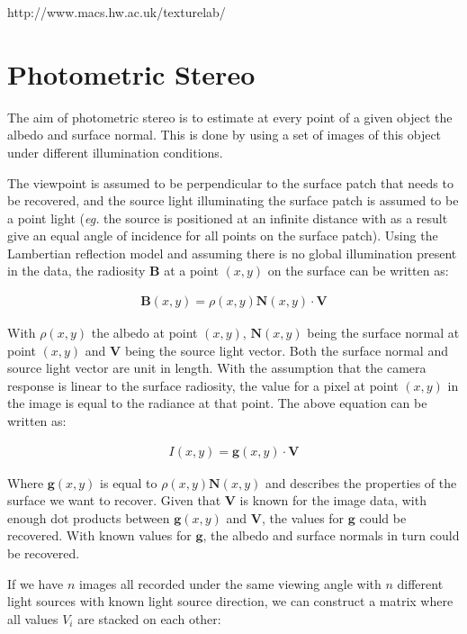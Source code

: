 http://www.macs.hw.ac.uk/texturelab/

\section{Photometric Stereo}\label{sec:PhotometricStereo}
The aim of photometric stereo is to estimate at every point of a given object the albedo and surface normal. This is done by using a set of images of this object under different illumination conditions. 

The viewpoint is assumed to be perpendicular to the surface patch that needs to be recovered, and the source light illuminating the surface patch is assumed to be a point light (\textit{eg.} the source is positioned at an infinite distance with as a result give an equal angle of incidence for all points on the surface patch). Using the Lambertian reflection model and assuming there is no global illumination present in the data, the radiosity \textbf{B} at a point $(x, y)$ on the surface can be written as:

	\begin{eqnarray*}
		\textbf{B}(x,y) = \rho(x,y)\textbf{N}(x,y) \cdot \textbf{V}
	\end{eqnarray*}

\noindent With $\rho(x,y)$ the albedo at point $(x,y)$, $\textbf{N}(x,y)$ being the surface normal at point $(x,y)$ and $\textbf{V}$ being the source light vector. Both the surface normal and source light vector are unit in length. With the assumption that the camera response is linear to the surface radiosity, the value for a pixel at point $(x,y)$ in the image is equal to the radiance at that point. The above equation can be written as:

	\begin{eqnarray*}
		I(x,y) =  \textbf{g}(x,y) \cdot \textbf{V}
	\end{eqnarray*}

\noindent Where $\textbf{g}(x,y)$ is equal to $\rho(x,y)\textbf{N}(x,y)$ and describes the properties of the surface we want to recover. Given that $\textbf{V}$ is known for the image data, with enough dot products between $\textbf{g}(x,y)$ and $\textbf{V}$, the values for $\textbf{g}$ could be recovered. With known values for $\textbf{g}$, the albedo and surface normals in turn could be recovered.

If we have $n$ images all recorded under the same viewing angle with $n$ different light sources with known light source direction, we can construct a matrix where all values $V_i$ are stacked on each other:

